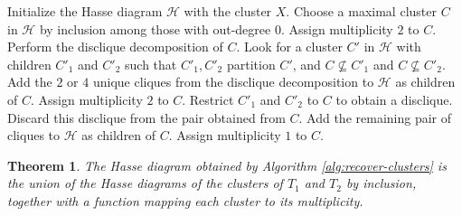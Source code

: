 \documentclass[12pt]{article}
\newtheorem{Theorem}{Theorem}[section]
\theoremstyle{definition}
\begin{document}
\begin{algorithm}[ht]
\caption{Recovering the Hasse diagram of clusters}
\label{alg:recover-clusters}
\begin{algorithmic}[1]
\State Initialize the Hasse diagram $\mathcal{H}$ with the cluster $X$.
\Statex
{}
    \State Choose a maximal cluster $C$ in $\mathcal{H}$ by inclusion among those with out-degree $0$.
        \State Assign multiplicity $2$ to $C$.
    \Else
        \State Perform the disclique decomposition of $C$.
        \State Look for a cluster $C'$ in $\mathcal{H}$ with children $C'_1$ and $C'_2$
        \Statex \hspace{\algorithmicindent}such that $C'_1,C'_2$ partition $C'$, and
        \Statex \hspace{\algorithmicindent}$C \nsubseteq C'_1$ and $C \nsubseteq C'_2$.
            \State Add the $2$ or $4$ unique cliques from the disclique decomposition
            \Statex \hspace{\algorithmicindent} to $\mathcal{H}$ as children of $C$.
            \State Assign multiplicity $2$ to $C$.
        \Else
            \State Restrict $C'_1$ and $C'_2$ to $C$ to obtain a disclique.
            \State Discard this disclique from the pair obtained from $C$.
            \State Add the remaining pair of cliques to $\mathcal{H}$ as children of $C$.
            \State Assign multiplicity $1$ to $C$.
        \EndIf
    \EndIf
\EndWhile
\end{algorithmic}
\end{algorithm}

\begin{Theorem}\label{t:hasse.union}
    The Hasse diagram obtained by Algorithm \ref{alg:recover-clusters} is the union of the Hasse diagrams of the clusters of $T_1$ and $T_2$ by inclusion, together with a function mapping each cluster to its multiplicity. 
\end{Theorem}
\end{document}
